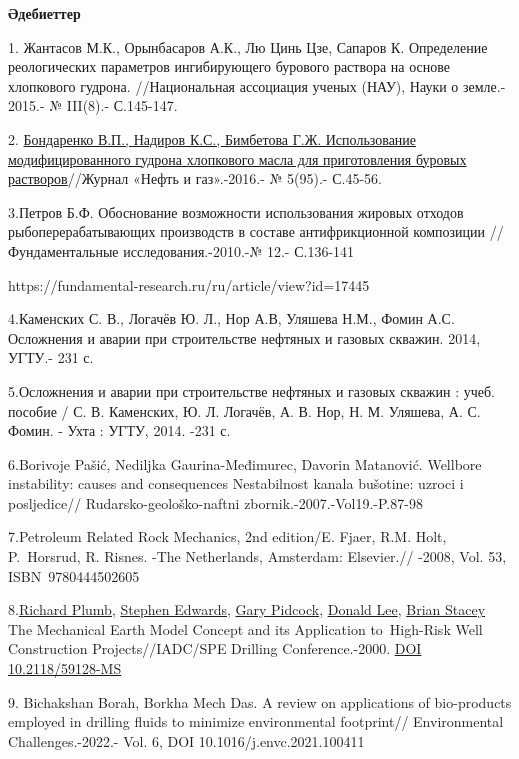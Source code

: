 \begin{center}
{\bfseries Әдебиеттер}
\end{center}

\begin{noparindent}

1. Жантасов М.К., Орынбасаров А.К., Лю Цинь Цзе, Сапаров К. Определение
реологических параметров ингибирующего бурового раствора на основе
хлопкового гудрона. //Национальная ассоциация ученых (НАУ), Науки о
земле.- 2015.- № III(8).- С.145-147.

2.
\href{http://neft-gas.kz/f/no_5_2016_neft_i_gaz-dlya_sajta2-1.pdf}{Бондаренко
В.П., Надиров К.С., Бимбетова Г.Ж. Использование модифицированного
гудрона хлопкового масла для приготовления буровых растворов}//Журнал
«Нефть и газ».-2016.- № 5(95).- С.45-56.

3.Петров Б.Ф. Обоснование возможности использования жировых отходов
рыбоперерабатывающих производств в составе антифрикционной композиции //
Фундаментальные исследования.-2010.-№ 12.- С.136-141

https://fundamental-research.ru/ru/article/view?id=17445

4.Каменских С. В., Логачёв Ю. Л., Нор А.В, Уляшева Н.М., Фомин А.С.
Осложнения и аварии при строительстве нефтяных и газовых скважин. 2014,
УГТУ.- 231 с.

5.Осложнения и аварии при строительстве нефтяных и газовых скважин :
учеб. пособие / С. В. Каменских, Ю. Л. Логачёв, А. В. Нор, Н. М.
Уляшева, А. С. Фомин. - Ухта : УГТУ, 2014. -231 с.

6.Borivoje Pašić, Nediljka Gaurina-Međimurec, Davorin Matanović.
Wellbore instability: causes and consequences Nestabilnost kanala
bušotine: uzroci i posljedice// Rudarsko-geološko-naftni
zbornik.-2007.-Vol19.-P.87-98

7.Petroleum Related Rock Mechanics, 2nd edition/E. Fjaer, R.M. Holt,
P.~Horsrud, R. Risnes. -The Netherlands, Amsterdam: Elsevier.// -2008,
Vol. 53, ISBN~9780444502605

8.\href{javascript:;}{Richard Plumb}, \href{javascript:;}{Stephen
Edwards}, \href{javascript:;}{Gary Pidcock}, \href{javascript:;}{Donald
Lee}, \href{javascript:;}{Brian Stacey} The Mechanical Earth Model
Concept and its Application to~High-Risk Well Construction
Projects//IADC/SPE Drilling Conference.-2000.
\href{https://doi.org/10.2118/59128-MS}{DOI 10.2118/59128-MS}

9. Bichakshan Borah, Borkha Mech Das. A review on applications of
bio-products employed in drilling fluids to minimize environmental
footprint// Environmental Challenges.-2022.- Vol. 6, DOI
10.1016/j.envc.2021.100411


\end{noparindent}
